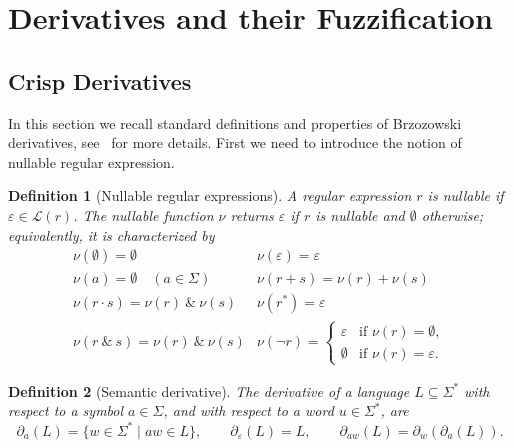 \documentclass{article}
\newtheorem{definition}{Definition}[section]
\begin{document}
\section{Derivatives and their Fuzzification}


\subsection{Crisp Derivatives}\label{crisp-derivative}
In this section we recall standard definitions and properties of Brzozowski derivatives, see~\cite{B64,Thiemann2016} for more details. First we need to introduce the notion of nullable regular expression. 
\begin{definition}[Nullable regular expressions]\label{def:nullable}
A regular expression $r$ is \emph{nullable} if $\varepsilon \in \mathcal{L}(r)$. The
\emph{nullable} function $\nu$ returns $\varepsilon$ if $r$ is nullable and $\emptyset$
otherwise; equivalently, it is characterized by
\[
\begin{array}{ll}
     \nu(\emptyset)=\emptyset &
     \nu(\varepsilon)=\varepsilon \\[1ex]
     \nu(a)=\emptyset \quad (a \in \Sigma)&
     \nu(r+s) = \nu(r) + \nu(s) \\[1ex]
     \nu(r\cdot s)=\nu(r)\: \& \: \nu(s) &
     \nu(r^*) = \varepsilon \\[1ex]
     \nu(r\:\&\:s) = \nu(r) \: \& \: \nu(s) &
     \nu(\neg r)=
     \begin{cases}
         \varepsilon & \text{if } \nu(r) = \emptyset, \\
         \emptyset & \text{if } \nu(r) = \varepsilon.
     \end{cases}
\end{array}
\]
\end{definition}

\begin{definition}[Semantic derivative]\label{def:derivative}\label{def:derivative-string}
The derivative of a language $L \subseteq \Sigma^*$ with respect to a symbol
$a\in\Sigma$, and with respect to a word $u\in\Sigma^*$, are
\[
  \partial_a(L)=\{ w \in \Sigma^* \mid a w \in L \},
  \qquad
  \partial_\varepsilon(L)=L,
  \qquad
  \partial_{aw}(L)=\partial_w(\partial_a(L)).
\]
\end{definition}
\end{document}
